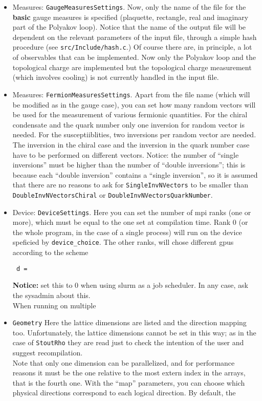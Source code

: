\begin{itemize}
    \item{Measures: \verb|GaugeMeasuresSettings|.} Now, only the name of the 
        file for the {\bf basic} gauge measures is specified (plaquette, 
rectangle, real and imaginary part of the Polyakov loop). 
        Notice that the name of the 
output file will be dependent on the relevant parameters of the input file, 
through a simple hash procedure (see \verb|src/Include/hash.c|.)
        Of course there are, in principle, a lot of observables that 
can be implemented. Now only the Polyakov loop and the topological charge are 
implemented but the topological charge measurement (which involves cooling) is 
not currently handled in the input file. 
    \item{Measures: \verb|FermionMeasuresSettings|.}
    Apart from the file name (which will be modified as in the gauge case),   
you can set how many random vectors will be used for the measurement of various 
fermionic quantities. For the chiral condensate and the quark number only one 
inversion for random vector is needed. For the susceptiiblities, two inversions 
per random vector are needed. The inversion in the chiral case and the inversion 
in the quark number case have to be performed on different vectors. Notice: the 
number of ``single inversions'' must be higher than the 
number of ``double inversions''; this is because each ``double inversion'' 
contains a ``single inversion'', so it is assumed that there are no reasons to 
ask for \verb|SingleInvNVectors| to be smaller than 
\verb|DoubleInvNVectorsChiral| or \verb|DoubleInvNVectorsQuarkNumber|.
    
    
    \item{Device: \verb|DeviceSettings|.}  Here you can set the number of 
mpi ranks (one or more), which must be equal to  the one set at compilation 
time. Rank 0 (or the whole program, in the case of a single process) will run 
on the device speficied by \verb|device_choice|. The other ranks, will chose 
different gpus according to the scheme
\begin{verbatim}
 d = 
\end{verbatim}


\textbf{Notice: } set this to 0 when using slurm as a job scheduler. In any 
case, ask the sysadmin about this.\\
When running on multiple 
    \item{\verb|Geometry|} Here the lattice dimensions are listed and the 
        direction mapping too. Unfortunately, the lattice dimensions cannot be set in 
        this way; as in the case of \verb|StoutRho| they are read just to check the 
        intention of the user and suggest recompilation. \\
        Note that only one dimension can be parallelized, and for performance 
reasons it must be the one relative to the most extern index in the arrays, 
that is the fourth one. With the ``map'' parameters, you can choose which 
physical directions correspond to each logical direction. By default, the 
       

\end{itemize}
